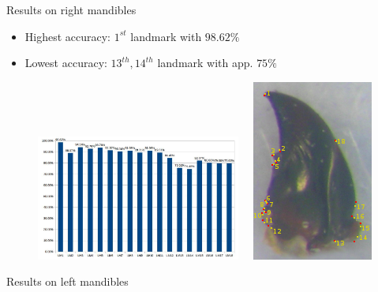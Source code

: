 \documentclass{LaBRI_poster}
\def\Put(#1,#2)#3{\leavevmode\makebox(0,0){\put(#1,#2){#3}}}
\begin{document}
\begin{frame}[t]
\begin{columns}[t]
\begin{column}{\twocolwidth}
\begin{block}{Results on right mandibles}
	\begin{itemize}
  		\item Highest accuracy: $1^{st}$ landmark with \textbf{$98.62\%$}
  		\item Lowest accuracy: $13^{th}, 14^{th}$ landmark with app. $75\%$
  	\end{itemize}
  	\begin{figure}[l]
		\includegraphics[width=0.6\textwidth]{images/md_chartlms}~~
		\includegraphics[scale=1.8]{images/md_rs}
	\end{figure}
  	
\end{block}

\begin{block}{Results on left mandibles}
	

\end{block}
\end{column}
\end{columns}
\end{frame}
\end{document}
